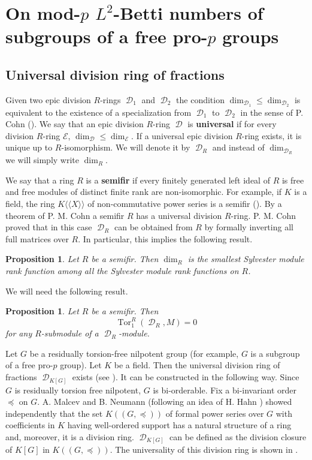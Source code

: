\documentclass[11pt]{amsart}
\newtheorem{pro}[lem]{Proposition}
\numberwithin{claimcounter}{lem}
\DeclareMathOperator{\D}{\mathcal D}
\DeclareMathOperator{\Tor}{Tor}
\begin{document}
\section{On mod-$p$ $L^2$-Betti numbers of subgroups of a free pro-$p$ groups}\label{betti}
\subsection{Universal division ring of fractions}\label{subsect:universa}


Given  two epic division $R$-rings  $\D_1$ and $\D_2$ the condition  $\dim_{\D_1}\le \dim_{\D_2}$   is equivalent to the existence of a specialization from $\D_1$ to $\D_2$ in the sense of P. Cohn (\cite[Subsection 4.1]{Cohfields}). We say that an epic division $R$-ring $\D$ is {\bf universal} if for every  division $R$-ring  $\mathcal E$, $\dim_{\D}\le \dim_{\mathcal E}$.
If a universal epic division $R$-ring exists, it is unique up to $R$-isomorphism. We will denote it by $\D_R$ and instead of $\dim_{\D_R}$ we will simply  write $\dim_R$.

We say that a ring $R$ is a {\bf semifir} if every finitely generated   left ideal of $R$ is free and free modules of distinct finite rank are non-isomorphic.  For example, if $K$ is a field, the ring $K\langle \! \langle  X\rangle \! \rangle  $ of non-commutative power series is a semifir (\cite[Theorem 2.9.4]{Cohfree}). By a theorem of  P. M. Cohn \cite{Coh74} a semifir $R$ has a universal division $R$-ring.  P. M. Cohn proved that in this case $\D_R$ can be obtained from $R$  by formally inverting all full matrices over $R$. In particular, this implies the following result.

\begin{pro} \label{internaldim}
Let $R$ be a semifir. Then
 $\dim_R$ is the smallest Sylvester module rank function among all the Sylvester module rank functions on $R$. 
 \end{pro} We will need the following result.
\begin{pro}\cite[Proposition 2.2]{Jataylor19} 
\label{vanTor} Let $R$ be a semifir. Then $$\Tor^R_1(\D_R, M)=0$$ for any $R$-submodule of a $\D_R$-module.
\end{pro}



Let $G$ be a residually torsion-free  nilpotent group (for example, $G$ is a subgroup of a free pro-$p$ group).   Let $K$ be a field. Then the universal division ring of fractions $\D_{K[G]}$ exists (see \cite{Ja20universal}). It can be constructed in the following way. Since $G$ is residually torsion free nilpotent, $G$ is bi-orderable. Fix a bi-invariant order $\preceq$ on $G$. A. Malcev \cite{Ma48} and B. Neumann \cite{Ne49} (following   an idea of H. Hahn \cite{Ha07}) showed independently that    the set $K((G,\preceq ))$ of formal power series over $G$ with coefficients in $K$ having well-ordered support has a natural structure of a ring and, moreover, it is a division ring.   $\D_{K[G]}$ can be defined as  the division closure of $K[G]$ in $K((G,\preceq ))$. The universality of this division ring is shown in \cite[Theorem 1.1]{Ja20universal}.
 
\end{document}
